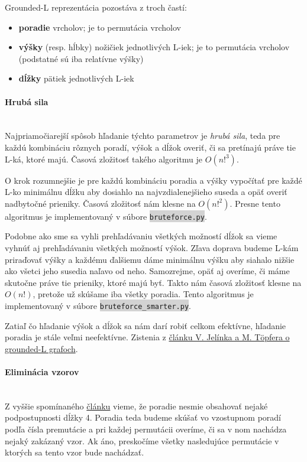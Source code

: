 \documentclass{article}
\newcommand{\code}[1]{\colorbox{lightgray}{\lstinline{#1}}}
\begin{document}
Grounded-L reprezentácia pozostáva z troch častí:
\begin{itemize}
    \item \textbf{poradie} vrcholov; je to permutácia vrcholov 
    \item \textbf{výšky} (resp. hĺbky) nožičiek jednotlivých L-iek; je to permutácia vrcholov (podstatné sú iba relatívne výšky)
    \item \textbf{dĺžky} pätiek jednotlivých L-iek
\end{itemize}

\paragraph{Hrubá sila}\mbox{} \\

Najpriamočiarejší spôsob hľadanie týchto parametrov je \textit{hrubá sila}, teda pre každú kombináciu rôznych poradí, výšok a dĺžok overiť, či sa pretínajú práve tie L-ká, ktoré majú.
Časová zložitosť takého algoritmu je $O(n!^3)$.

O krok rozumnejšie je pre každú kombináciu poradia a výšky vypočítať pre každé L-ko minimálnu dĺžku aby dosiahlo na najvzdialenejšieho suseda a opäť overiť nadbytočné prieniky. Časová zložitosť nám klesne na $O(n!^2)$. Presne tento algoritmus je implementovaný v súbore \code{bruteforce.py}.

Podobne ako sme sa vyhli prehľadávaniu všetkých možností dĺžok sa vieme vyhnúť aj prehľadávaniu všetkých možností výšok.
Zľava doprava budeme L-kám priraďovať výšky a každému ďalšiemu dáme minimálnu výšku aby siahalo nižšie ako všetci jeho susedia naľavo od neho. Samozrejme, opäť aj overíme, či máme skutočne práve tie prieniky, ktoré majú byť.
Takto nám časová zložitosť klesne na $O(n!)$, pretože už skúšame iba všetky poradia. Tento algoritmus je implementovaný v súbore \code{bruteforce_smarter.py}.

Zatiaľ čo hľadanie výšok a dĺžok sa nám darí robiť celkom efektívne, hľadanie poradia je stále veľmi neefektívne. Zistenia z \href{https://arxiv.org/abs/1808.04148}{článku V. Jelínka a M. Töpfera o grounded-L grafoch}.

\paragraph{Eliminácia vzorov}\mbox{} \\

Z vyššie spomínaného \href{https://arxiv.org/abs/1808.04148}{článku} vieme, že poradie nesmie obsahovať nejaké podpostupnosti dĺžky 4. 
Poradia teda budeme skúšať vo vzostupnom poradí podľa čísla premutácie a pri každej permutácii overíme, či sa v nom nachádza nejaký zakázaný vzor. Ak áno, preskočíme všetky nasledujúce permutácie v ktorých sa tento vzor bude nachádzať. 
\end{document}
